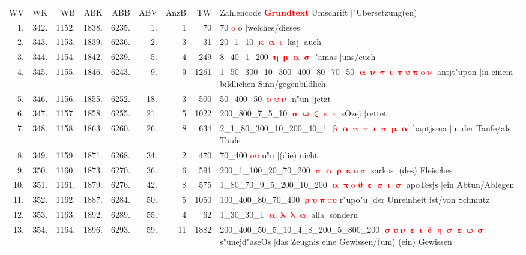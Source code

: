 \documentclass[a4paper,10pt,landscape]{article}
\begin{document}
\begin{tabular}{rrrrrrrrp{120mm}}
WV&WK&WB&ABK&ABB&ABV&AnzB&TW&Zahlencode \textcolor{red}{$\boldsymbol{Grundtext}$} Umschrift $|$"Ubersetzung(en)\\
1.&342.&1152.&1838.&6235.&1.&1&70&70 \textcolor{red}{$\boldsymbol{\mathrm{o}}$} o $|$welches/dieses\\
2.&343.&1153.&1839.&6236.&2.&3&31&20\_1\_10 \textcolor{red}{$\boldsymbol{\upkappa\upalpha\upiota}$} kaj $|$auch\\
3.&344.&1154.&1842.&6239.&5.&4&249&8\_40\_1\_200 \textcolor{red}{$\boldsymbol{\upeta\upmu\upalpha\upsigma}$} "amas $|$uns/euch\\
4.&345.&1155.&1846.&6243.&9.&9&1261&1\_50\_300\_10\_300\_400\_80\_70\_50 \textcolor{red}{$\boldsymbol{\upalpha\upnu\uptau\upiota\uptau\upsilon\uppi\mathrm{o}\upnu}$} antjt"upon $|$in einem bildlichen Sinn/gegenbildlich\\
5.&346.&1156.&1855.&6252.&18.&3&500&50\_400\_50 \textcolor{red}{$\boldsymbol{\upnu\upsilon\upnu}$} n"un $|$jetzt\\
6.&347.&1157.&1858.&6255.&21.&5&1022&200\_800\_7\_5\_10 \textcolor{red}{$\boldsymbol{\upsigma\upomega\upzeta\upepsilon\upiota}$} sOzej $|$rettet\\
7.&348.&1158.&1863.&6260.&26.&8&634&2\_1\_80\_300\_10\_200\_40\_1 \textcolor{red}{$\boldsymbol{\upbeta\upalpha\uppi\uptau\upiota\upsigma\upmu\upalpha}$} baptjsma $|$in der Taufe/als Taufe\\
8.&349.&1159.&1871.&6268.&34.&2&470&70\_400 \textcolor{red}{$\boldsymbol{\mathrm{o}\upsilon}$} o"u $|$(die) nicht\\
9.&350.&1160.&1873.&6270.&36.&6&591&200\_1\_100\_20\_70\_200 \textcolor{red}{$\boldsymbol{\upsigma\upalpha\uprho\upkappa\mathrm{o}\upsigma}$} sarkos $|$(des) Fleisches\\
10.&351.&1161.&1879.&6276.&42.&8&575&1\_80\_70\_9\_5\_200\_10\_200 \textcolor{red}{$\boldsymbol{\upalpha\uppi\mathrm{o}\upvartheta\upepsilon\upsigma\upiota\upsigma}$} apoTesjs $|$ein Abtun/Ablegen\\
11.&352.&1162.&1887.&6284.&50.&5&1050&100\_400\_80\_70\_400 \textcolor{red}{$\boldsymbol{\uprho\upsilon\uppi\mathrm{o}\upsilon}$} r"upo"u $|$der Unreinheit ist/von Schmutz\\
12.&353.&1163.&1892.&6289.&55.&4&62&1\_30\_30\_1 \textcolor{red}{$\boldsymbol{\upalpha\uplambda\uplambda\upalpha}$} alla $|$sondern\\
13.&354.&1164.&1896.&6293.&59.&11&1882&200\_400\_50\_5\_10\_4\_8\_200\_5\_800\_200 \textcolor{red}{$\boldsymbol{\upsigma\upsilon\upnu\upepsilon\upiota\updelta\upeta\upsigma\upepsilon\upomega\upsigma}$} s"unejd"aseOs $|$das Zeugnis eine Gewissen/(um) (ein) Gewissen\\

\end{tabular}
\end{document}
